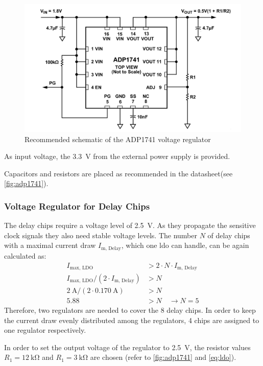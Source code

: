 \begin{figure}[tbh]
	\centering
	\includegraphics[width = \textwidth]{chap/04-work/img/adp1741_d}
	\caption{Recommended schematic of the ADP1741 voltage regulator \cite{adp1741}}
	\label{fig:adp1741}
\end{figure}

As input voltage, the \SI{3.3}{\volt} from the external power supply is provided. 

Capacitors and resistors are placed as recommended in the datasheet\cite{adp1741}(see \autoref{fig:adp1741}).

\subsubsection*{Voltage Regulator for Delay Chips}
The delay chips require a voltage level of \SI{2.5}{\volt}. As they propagate the sensitive clock signals they also need stable voltage levels. 
The number $N$ of delay chips with a maximal current draw $I_\text{m, Delay}$, which one \gls{ldo} can handle, can be again calculated as:
\begin{align*}
	I_\text{max, LDO} &> 2 \cdot N \cdot I_\text{m, Delay} \\
	I_\text{max, LDO}/(2 \cdot I_\text{m, Delay}) &> N \\
	\SI{2}{\ampere} / (2\cdot \SI{0.170}{\ampere}) &> N \\
	5.88 &> N \quad \rightarrow N = 5	
\end{align*}
Therefore, two regulators are needed to cover the 8 delay chips.
In order to keep the current draw evenly distributed among the regulators, 4 chips are assigned to one regulator respectively.

In order to set the output voltage of the regulator to \SI{2.5}{\volt}, the resistor values $R_1 = \SI{12}{\kilo \ohm}$ and $R_1 = \SI{3}{\kilo \ohm}$ are chosen (refer to \autoref{fig:adp1741} and \autoref{eq:ldo}).

